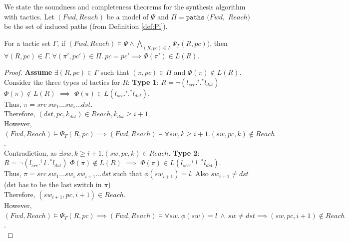 %
We state the soundness and completeness theorems 
for the synthesis algorithm with tactics. 
Let $(Fwd, Reach)$ be a model of $\Psi$ and 
$\Pi = \texttt{paths}$ $(Fwd,$ $Reach)$ be the set
of induced paths (from Definition \ref{def:Pi}).
\begin{theorem}[Soundness]
	For a tactic set $\Gamma$, if $(Fwd, Reach) \models \Psi \wedge \bigwedge\limits_{(R, pc) \in \Gamma} \Psi_T(R,pc)) $, 
	then $\forall (R, pc) \in \Gamma. ~\forall(\pi', pc') \in \Pi. ~pc = pc' \implies \Phi(\pi') \in L(R)$.
\end{theorem}
\iffull
\begin{proof}
	\textbf{Assume} $\exists (R,pc) \in \Gamma$ such that $(\pi, pc) \in \Pi$ and $\Phi(\pi) \not\in L(R)$.
	Consider the three types of tactics for $R$: \newline
	\textbf{Type 1}: $R = \neg (l_{src} .^i .^* l_{dst})$ \\
	$\Phi(\pi) \not\in L(R)$ $\implies$ $\Phi(\pi) \in L(l_{src} .^i .^* l_{dst})$. \\
	Thus, $\pi = src\ sw_1 \ldots sw_i \ldots dst$. \\
	Therefore,  $(dst, pc, k_{dst}) \in Reach, k_{dst} \geq i + 1$. \\
	However, $(Fwd, Reach) \models \Psi_T(R, pc) \implies (Fwd, Reach) \models \forall sw,k \geq i + 1. (sw,pc,k) \notin Reach$.\\
	Contradiction, as $\exists sw, k \geq i + 1. (sw,pc,k) \in Reach$.
	\newline
	\newline
	\textbf{Type 2}: $R = \neg (l_{src} .^i \ l \ .^* l_{dst})$ \newline
	$\Phi(\pi) \not\in L(R)$ $\implies$ $\Phi(\pi) \in L (l_{src} .^i \ l \ .^* l_{dst})$. \\
	Thus, $\pi = src\ sw_1 \ldots sw_i \ sw_{i+1} \ldots dst$ such that $\phi(sw_{i+1}) = l$. Also $sw_{i+1} \not=dst$ (dst has to be the last switch in $\pi$)\\
	Therefore,  $(sw_{i+1}, pc, i+1) \in Reach$. \\
	However,
	$(Fwd, Reach) \models \Psi_T(R, pc) \implies (Fwd, Reach) \models \forall sw.~ \phi(sw) = l ~\wedge~ sw \not= dst \implies  (sw, pc, i + 1) \notin Reach$. \\

\end{proof}
